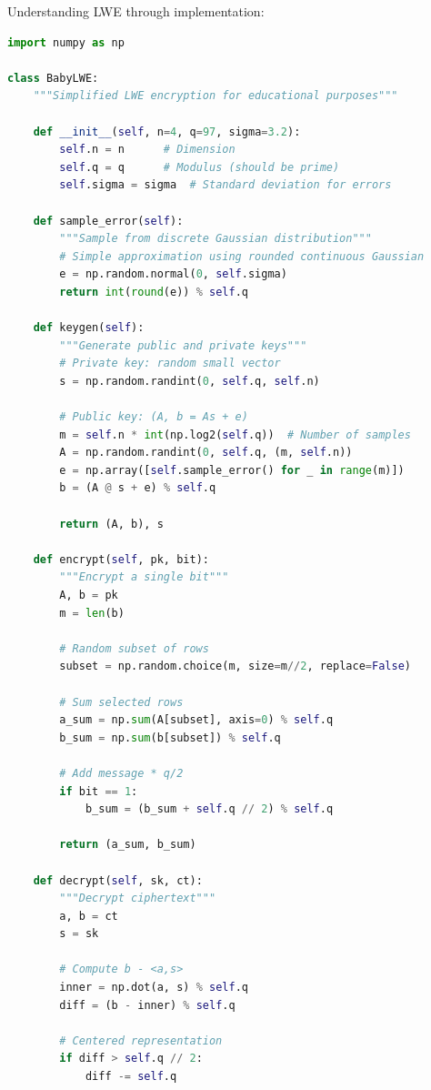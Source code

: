 \documentclass[11pt,a4paper]{article}
\begin{document}
Understanding LWE through implementation:

\begin{lstlisting}[language=Python, caption=Baby LWE Encryption Scheme]
import numpy as np

class BabyLWE:
    """Simplified LWE encryption for educational purposes"""
    
    def __init__(self, n=4, q=97, sigma=3.2):
        self.n = n      # Dimension
        self.q = q      # Modulus (should be prime)
        self.sigma = sigma  # Standard deviation for errors
        
    def sample_error(self):
        """Sample from discrete Gaussian distribution"""
        # Simple approximation using rounded continuous Gaussian
        e = np.random.normal(0, self.sigma)
        return int(round(e)) % self.q
    
    def keygen(self):
        """Generate public and private keys"""
        # Private key: random small vector
        s = np.random.randint(0, self.q, self.n)
        
        # Public key: (A, b = As + e)
        m = self.n * int(np.log2(self.q))  # Number of samples
        A = np.random.randint(0, self.q, (m, self.n))
        e = np.array([self.sample_error() for _ in range(m)])
        b = (A @ s + e) % self.q
        
        return (A, b), s
    
    def encrypt(self, pk, bit):
        """Encrypt a single bit"""
        A, b = pk
        m = len(b)
        
        # Random subset of rows
        subset = np.random.choice(m, size=m//2, replace=False)
        
        # Sum selected rows
        a_sum = np.sum(A[subset], axis=0) % self.q
        b_sum = np.sum(b[subset]) % self.q
        
        # Add message * q/2
        if bit == 1:
            b_sum = (b_sum + self.q // 2) % self.q
            
        return (a_sum, b_sum)
    
    def decrypt(self, sk, ct):
        """Decrypt ciphertext"""
        a, b = ct
        s = sk
        
        # Compute b - <a,s>
        inner = np.dot(a, s) % self.q
        diff = (b - inner) % self.q
        
        # Centered representation
        if diff > self.q // 2:
            diff -= self.q
            

\end{lstlisting}
\end{document}

